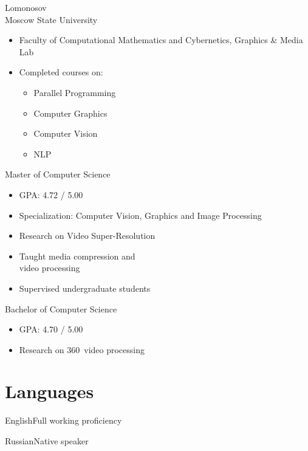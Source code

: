 \documentclass{tccv}
\newcommand{\sphere}{360\textdegree~}
\begin{document}
\begin{eventlist}

\evententry{}
     {Lomonosov\\Moscow State University}
     {}
\vspace{-10pt}
\begin{itemize}
     \item Faculty of Computational Mathematics and Cybernetics, Graphics \& Media Lab
     \item Completed courses on:
     \begin{itemize}
          \item Parallel Programming
          \item Computer Graphics
          \item Computer Vision
          \item NLP
     \end{itemize}
\end{itemize}

     {}
     {Master of Computer Science}
\begin{itemize}
     \item GPA: 4.72 / 5.00
     \item Specialization: Computer Vision, Graphics and Image Processing
     \item Research on Video Super-Resolution
     \item Taught media compression and \\ video processing
     \item Supervised undergraduate students
\end{itemize}

     {}
     {Bachelor of Computer Science}
\begin{itemize}
     \item GPA: 4.70 / 5.00
     \item Research on \sphere video processing 
\end{itemize}

\end{eventlist}

\section{Languages}

\begin{factlist}
     \item{English}{Full working proficiency}
     \item{Russian}{Native speaker}
\end{factlist}
\end{document}
